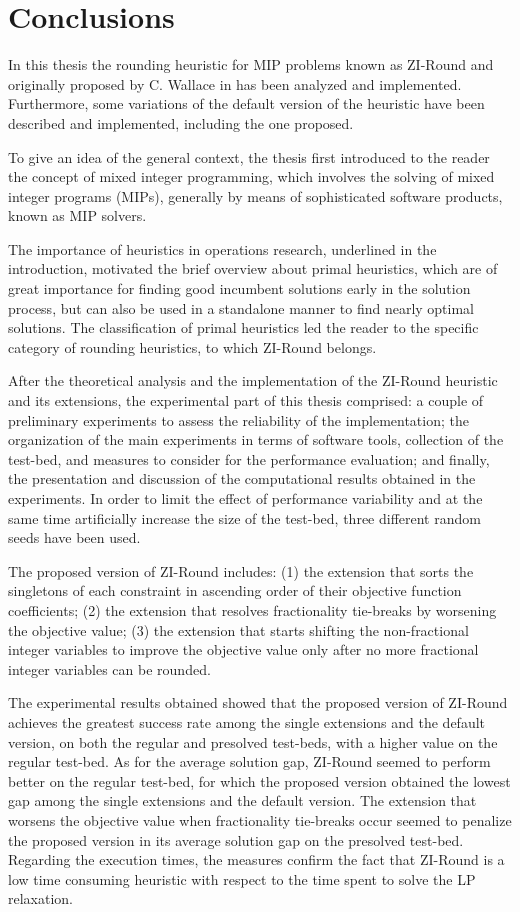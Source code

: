 \documentclass[a4paper,12pt,twoside]{scrbook}
\begin{document}
\chapter{Conclusions} \label{ch:conclusions}
In this thesis the rounding heuristic for MIP problems known as ZI-Round and originally proposed by C. Wallace in \cite{wallace2010} has been analyzed and implemented. Furthermore, some variations of the default version of the heuristic have been described and implemented, including the one proposed. \par
To give an idea of the general context, the thesis first introduced to the reader the concept of mixed integer programming, which involves the solving of mixed integer programs (MIPs), generally by means of sophisticated software products, known as MIP solvers. \par 
The importance of heuristics in operations research, underlined in the introduction, motivated the brief overview about primal heuristics, which are of great importance for finding good incumbent solutions early in the solution process, but can also be used in a standalone manner to find nearly optimal solutions. The classification of primal heuristics led the reader to the specific category of rounding heuristics, to which ZI-Round belongs. \par 
After the theoretical analysis and the implementation of the ZI-Round heuristic and its extensions, the experimental part of this thesis comprised: a couple of preliminary experiments to assess the reliability of the implementation; the organization of the main experiments in terms of software tools, collection of the test-bed, and measures to consider for the performance evaluation; and finally, the presentation and discussion of the computational results obtained in the experiments. In order to limit the effect of performance variability and at the same time artificially increase the size of the test-bed, three different random seeds have been used. \par 
The proposed version of ZI-Round includes: (1) the extension that sorts the singletons of each constraint in ascending order of their objective function coefficients; (2) the extension that resolves fractionality tie-breaks by worsening the objective value; (3) the extension that starts shifting the non-fractional integer variables to improve the objective value only after no more fractional integer variables can be rounded. \par 
The experimental results obtained showed that the proposed version of ZI-Round achieves the greatest success rate among the single extensions and the default version, on both the regular and presolved test-beds, with a higher value on the regular test-bed. As for the average solution gap, ZI-Round seemed to perform better on the regular test-bed, for which the proposed version obtained the lowest gap among the single extensions and the default version. The extension that worsens the objective value when fractionality tie-breaks occur seemed to penalize the proposed version in its average solution gap on the presolved test-bed. Regarding the execution times, the measures confirm the fact that ZI-Round is a low time consuming heuristic with respect to the time spent to solve the LP relaxation. \par 
\end{document}
